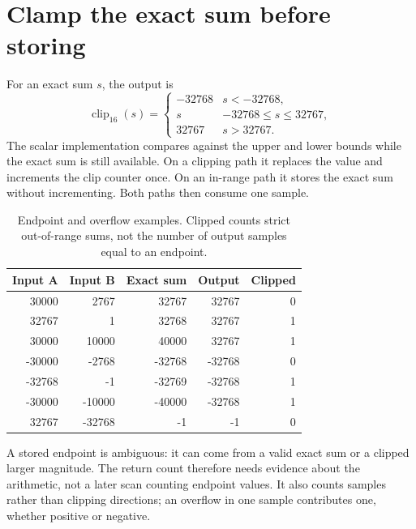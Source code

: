 \section{Clamp the exact sum before storing}\label{pcm-saturation}
For an exact sum $s$, the output is
\[
 \operatorname{clip}_{16}(s)=
 \begin{cases}
 -32768 & s<-32768,\\
 s & -32768\leq s\leq32767,\\
 32767 & s>32767.
 \end{cases}
\]
The scalar implementation compares against the upper and lower bounds while the
exact sum is still available. On a clipping path it replaces the value and increments
the clip counter once. On an in-range path it stores the exact sum without incrementing.
Both paths then consume one sample.

\begin{table}[htbp]
\centering
\caption{Endpoint and overflow examples. Clipped counts strict out-of-range sums, not the number of output samples equal to an endpoint.}
\begin{tabular}{rrrrr}
\toprule
Input A & Input B & Exact sum & Output & Clipped\\
\midrule
30000 & 2767 & 32767 & 32767 & 0\\
32767 & 1 & 32768 & 32767 & 1\\
30000 & 10000 & 40000 & 32767 & 1\\
-30000 & -2768 & -32768 & -32768 & 0\\
-32768 & -1 & -32769 & -32768 & 1\\
-30000 & -10000 & -40000 & -32768 & 1\\
32767 & -32768 & -1 & -1 & 0\\
\bottomrule
\end{tabular}
\end{table}

A stored endpoint is ambiguous: it can come from a valid exact sum or a clipped
larger magnitude. The return count therefore needs evidence about the arithmetic,
not a later scan counting endpoint values. It also counts samples rather than
clipping directions; an overflow in one sample contributes one, whether positive
or negative.
